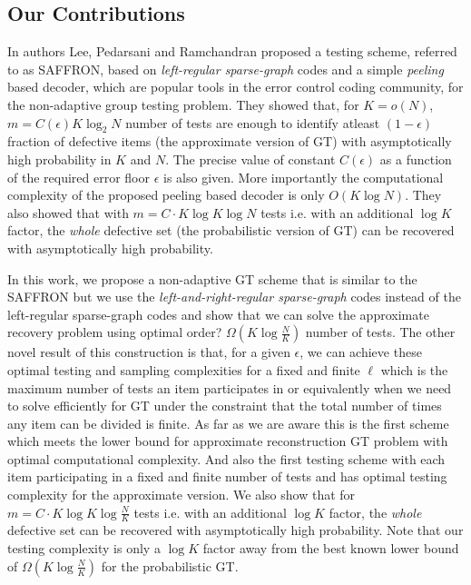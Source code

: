 \documentclass[conference,,twocolumn]{IEEEtran}
\begin{document}
\subsection{Our Contributions}
In \cite{lee2015saffron} authors Lee, Pedarsani and Ramchandran proposed a testing scheme, referred to as SAFFRON, based on \textit{left-regular sparse-graph} codes and a simple \textit{peeling} based decoder\cite{richardson2008modern}, which are popular tools in the error control coding community, for the non-adaptive group testing problem. They showed that, for $K=o(N)$, $m=C(\epsilon)K\log_2 N$ number of tests are enough to identify atleast $(1-\epsilon)$ fraction of defective items (the approximate version of GT) with asymptotically high probability in $K$ and $N$. The precise value of constant $C(\epsilon)$ as a function of the required error floor $\epsilon$ is also given. More importantly the computational complexity of the proposed peeling based decoder is only $O(K\log N)$. They also showed that with $m=C\cdot K\log K \log N$ tests  i.e. with an additional $\log K$ factor, the \textit{whole} defective set (the probabilistic version of GT) can be recovered with asymptotically high probability.

In this work, we propose a non-adaptive GT scheme that is similar to the SAFFRON but we use the \textit{left-and-right-regular sparse-graph} codes instead of the left-regular sparse-graph codes and show that we can solve the approximate recovery problem using {\blue optimal order?} $\Omega(K\log \frac{N}{K})$ number of tests. The other novel result of this construction is that, for a given $\epsilon$, we can achieve these optimal testing and sampling complexities for a fixed and finite $\ell$ which is the maximum number of tests an item participates in or equivalently when we need to solve efficiently for GT under the constraint that the total number of times any item can be divided\cite{gandikotanearly} is finite. As far as we are aware this is the first scheme which meets the lower bound for approximate reconstruction GT problem with optimal computational complexity. And also the first testing scheme with each item participating in a fixed and finite number of tests and has optimal testing complexity for the approximate version. We also show that for $m=C\cdot K\log K \log \frac{N}{K}$ tests  i.e. with an additional $\log K$ factor, the \textit{whole} defective set can be recovered with asymptotically high probability. Note that our testing complexity is only a $\log K$ factor away from the best known lower bound of $\Omega(K\log \frac{N}{K})$ \cite{chan2014non} for the probabilistic GT.
\end{document}
